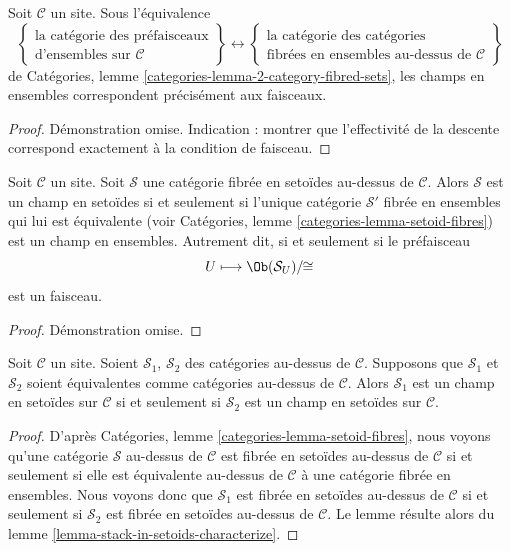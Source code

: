 \begin{lemma}
\label{lemma-when-stack-in-sets}
Soit $\mathcal{C}$ un site. Sous l'équivalence
$$
\left\{
\begin{matrix}
\text{la catégorie des préfaisceaux}\\
\text{d'ensembles sur }\mathcal{C}
\end{matrix}
\right\}
\leftrightarrow
\left\{
\begin{matrix}
\text{la catégorie des catégories}\\
\text{fibrées en ensembles au-dessus de }\mathcal{C}
\end{matrix}
\right\}
$$
de
Catégories, lemme \ref{categories-lemma-2-category-fibred-sets},
les champs en ensembles correspondent précisément aux faisceaux.
\end{lemma}

\begin{proof}
Démonstration omise. Indication : montrer que l'effectivité de la descente correspond exactement à
la condition de faisceau.
\end{proof}

\begin{lemma}
\label{lemma-stack-in-setoids-characterize}
Soit $\mathcal{C}$ un site.
Soit $\mathcal{S}$ une catégorie fibrée en setoïdes au-dessus de $\mathcal{C}$.
Alors $\mathcal{S}$ est un champ en setoïdes si et seulement si l'unique
catégorie $\mathcal{S}'$ fibrée en ensembles qui lui est équivalente (voir
Catégories, lemme \ref{categories-lemma-setoid-fibres})
est un champ en ensembles. Autrement dit, si et seulement si le préfaisceau
$$
U \longmapsto \Ob(\mathcal{S}_U)/\!\!\cong
$$
est un faisceau.
\end{lemma}

\begin{proof}
Démonstration omise.
\end{proof}

\begin{lemma}
\label{lemma-stack-in-setoids-equivalent}
Soit $\mathcal{C}$ un site.
Soient $\mathcal{S}_1$, $\mathcal{S}_2$ des catégories au-dessus de $\mathcal{C}$.
Supposons que $\mathcal{S}_1$ et $\mathcal{S}_2$ soient équivalentes
comme catégories au-dessus de $\mathcal{C}$.
Alors $\mathcal{S}_1$ est un champ en setoïdes sur $\mathcal{C}$ si et seulement si
$\mathcal{S}_2$ est un champ en setoïdes sur $\mathcal{C}$.
\end{lemma}

\begin{proof}
D'après
Catégories, lemme \ref{categories-lemma-setoid-fibres},
nous voyons qu'une catégorie $\mathcal{S}$ au-dessus de $\mathcal{C}$ est fibrée en setoïdes
au-dessus de $\mathcal{C}$ si et seulement si elle est équivalente au-dessus de $\mathcal{C}$
à une catégorie fibrée en ensembles.
Nous voyons donc que $\mathcal{S}_1$ est fibrée en setoïdes au-dessus de $\mathcal{C}$
si et seulement si $\mathcal{S}_2$ est fibrée en setoïdes au-dessus de $\mathcal{C}$.
Le lemme résulte alors du
lemme \ref{lemma-stack-in-setoids-characterize}.
\end{proof}

